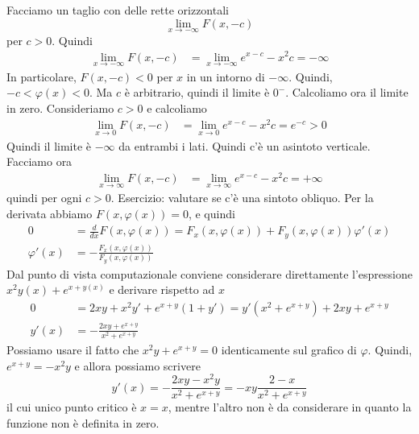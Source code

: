 \documentclass[a4paper]{article}
\begin{document}
{    Facciamo un taglio con delle rette orizzontali
    \[
        \lim_{x\to -\infty} F(x, -c)
    \]
    per \(c>0\). Quindi
    \begin{align*}
        \lim_{x\to -\infty} F(x, -c)
        &= \lim_{x\to -\infty} e^{x-c} -x^2c = -\infty
    \end{align*}
    In particolare, \(F(x, -c) < 0\) per \(x\) in un intorno di \(-\infty\).
    Quindi, \(-c < \varphi(x) < 0\).
    Ma \(c\) è arbitrario, quindi il limite è \(0^-\).
    Calcoliamo ora il limite in zero.
    Consideriamo \(c>0\) e calcoliamo
    \begin{align*}
        \lim_{x\to 0} F(x, -c)
        &= \lim_{x\to 0} e^{x-c} -x^2c = e^{-c} > 0
    \end{align*}
    Quindi il limite è \(-\infty\) da entrambi i lati.
    Quindi c'è un asintoto verticale.
    Facciamo ora
        \begin{align*}
        \lim_{x\to \infty} F(x, -c)
        &= \lim_{x\to \infty} e^{x-c} -x^2c = +\infty
    \end{align*}
    quindi per ogni \(c>0\).
    Esercizio: valutare se c'è una sintoto obliquo.
    Per la derivata abbiamo \(F(x, \varphi(x))=0\),
    e quindi
    \begin{align*}
        0 &= \frac{d}{dx} F(x,\varphi(x))
        = F_x(x, \varphi(x)) + F_y(x, \varphi(x)) \varphi'(x) \\
        \varphi'(x) &= -\frac{F_x(x, \varphi(x))}{F_y(x, \varphi(x))}
    \end{align*}
    Dal punto di vista computazionale conviene considerare direttamente l'espressione
    \(x^2y(x) + e^{x + y(x)}\) e derivare rispetto ad \(x\)
    \begin{align*}
        0 &= 2xy + x^2y' + e^{x+y}(1 + y')
        = y'(x^2 + e^{x+y}) + 2xy + e^{x+y} \\
        y'(x) &= -\frac{2xy + e^{x+y}}{x^2 + e^{x+y}}
    \end{align*}
    Possiamo usare il fatto che \(x^2y + e^{x+y} = 0\) identicamente sul grafico di \(\varphi\).
    Quindi, \(e^{x+y} = -x^2y\) e  allora possiamo scrivere
    \[
        y'(x) = - \frac{2xy - x^2y}{x^2 + e^{x+y}}
        = - xy \frac{2-x}{x^2 + e^{x+y}}
    \]
    il cui unico punto critico è \(x=x\), mentre l'altro non è
    da considerare in quanto la funzione non è definita in zero.
}
\end{document}
